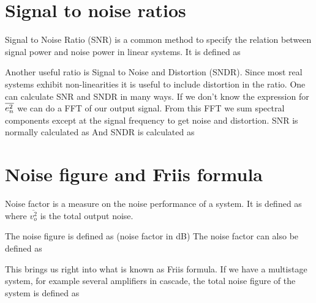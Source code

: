 \section{Signal to noise ratios}
Signal to Noise Ratio (SNR) is a common method to specify the relation
between signal power and noise power in linear systems. It is defined as

Another useful ratio is Signal to Noise and Distortion (SNDR).
Since most real systems exhibit non-linearities it is useful to include
distortion in the ratio.  One can calculate SNR and SNDR in many
ways. If we don't know the expression for $\overline{e_{n}^2}$ we can do a FFT of
our output signal. From this FFT we sum spectral components except at the
signal frequency to get noise and distortion. SNR is normally
calculated as
And SNDR is calculated as

\section{Noise figure and Friis formula}
Noise factor is a measure on the noise performance of a system. It is
defined as 
where $\overline{v_o^2}$ is the total output noise. 


The noise figure is defined as (noise factor in dB)
The noise factor can also be defined as

This brings us right into what is known as Friis formula. If we have
a multistage system, for example several amplifiers in cascade, the
total noise figure of the system is defined as 

